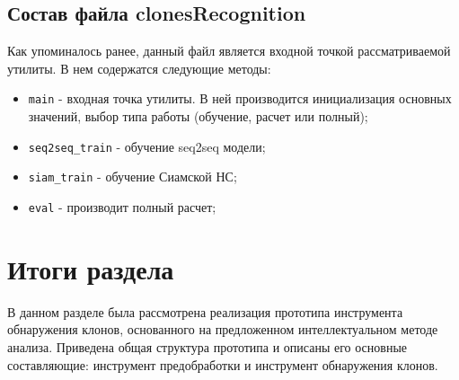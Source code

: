 \subsection{Состав файла clonesRecognition}

Как упоминалось ранее, данный файл является входной точкой рассматриваемой утилиты. В нем содержатся следующие методы:

\begin{itemize}
\setlength\itemsep{0mm}
\item \texttt{main} - входная точка утилиты. В ней производится инициализация основных значений, выбор типа работы (обучение, расчет или полный);
\item \texttt{seq2seq\_train} - обучение seq2seq модели;
\item \texttt{siam\_train} - обучение Сиамской НС;
\item \texttt{eval} - производит полный расчет;
\end{itemize}

\section{Итоги раздела}

В данном разделе была рассмотрена реализация прототипа инструмента обнаружения клонов, основанного на предложенном интеллектуальном методе анализа. Приведена общая структура прототипа и описаны его основные составляющие: инструмент предобработки и инструмент обнаружения клонов.
